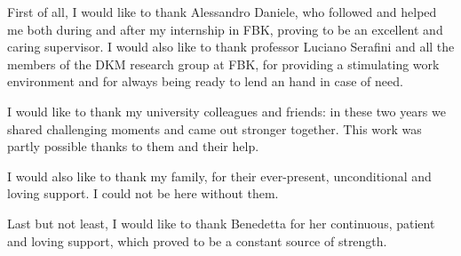 First of all, I would like to thank Alessandro Daniele, who followed and helped me both during and after my internship in FBK, proving to be an excellent and caring supervisor. I would also like to thank professor Luciano Serafini and all the members of the DKM research group at FBK, for providing a stimulating work environment and for always being ready to lend an hand in case of need. 
\vspace{10pt}

\noindent
I would like to thank my university colleagues and friends: in these two years we shared challenging moments and came out stronger together. This work was partly possible thanks to them and their help.
\vspace{10pt}

\noindent
I would also like to thank my family, for their ever-present, unconditional and loving support. I could not be here without them.
\vspace{10pt}

\noindent
Last but not least, I would like to thank Benedetta for her continuous, patient and loving support, which proved to be a constant source of strength.